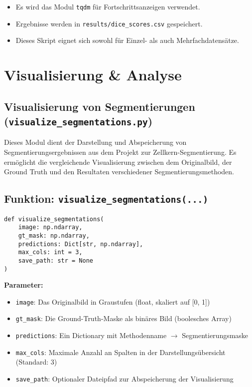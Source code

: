 \documentclass[a4paper,12pt]{article}
\begin{document}
\begin{itemize}
  \item Es wird das Modul \texttt{tqdm} für Fortschrittsanzeigen verwendet.
  \item Ergebnisse werden in \texttt{results/dice\_scores.csv} gespeichert.
  \item Dieses Skript eignet sich sowohl für Einzel- als auch Mehrfachdatensätze.
\end{itemize}

\section*{ Visualisierung \& Analyse}

\subsection*{ Visualisierung von Segmentierungen (\texttt{visualize\_segmentations.py})}

Dieses Modul dient der Darstellung und Abspeicherung von Segmentierungsergebnissen aus dem Projekt zur Zellkern-Segmentierung. Es ermöglicht die vergleichende Visualisierung zwischen dem Originalbild, der Ground Truth und den Resultaten verschiedener Segmentierungsmethoden.

\subsection*{ Funktion: \texttt{visualize\_segmentations(...)}}

\begin{verbatim}
def visualize_segmentations(
    image: np.ndarray,
    gt_mask: np.ndarray,
    predictions: Dict[str, np.ndarray],
    max_cols: int = 3,
    save_path: str = None
)
\end{verbatim}

\textbf{Parameter:}
\begin{itemize}
  \item \texttt{image}: Das Originalbild in Graustufen (float, skaliert auf [0, 1])
  \item \texttt{gt\_mask}: Die Ground-Truth-Maske als binäres Bild (boolesches Array)
  \item \texttt{predictions}: Ein Dictionary mit Methodenname $\rightarrow$ Segmentierungsmaske
  \item \texttt{max\_cols}: Maximale Anzahl an Spalten in der Darstellungsübersicht (Standard: 3)
  \item \texttt{save\_path}: Optionaler Dateipfad zur Abspeicherung der Visualisierung
\end{itemize}
\end{document}

